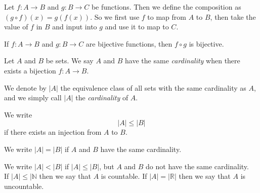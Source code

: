 \documentclass[../main.tex]{subfiles}
\begin{document}
\begin{definition}
Let $f: A \to B$ and $g:B \to C$ be functions. Then we define the composition as $(g \circ f)(x) = g(f(x))$. So we first use $f$ to map from $A$ to $B$, then take the value of $f$ in $B$ and input into $g$ and use it to map to $C$.
\end{definition}



\begin{proposition}
If $f: A \to B$ and $g: B\to C$ are bijective functions, then $f \circ g$ is bijective.
\end{proposition}






\begin{definition} \label{def:cardinality}
    Let \( A \) and \( B \) be sets. We say \( A \) and \( B \) have the same \textit{cardinality} when there exists a bijection \( f: A \to B \). 
    
    We denote by \( |A| \) the equivalence class of all sets with the same cardinality as \( A \), and we simply call \( |A| \) the \textit{cardinality} of \( A \).
\end{definition}
    
    
    
    
    
    
    
    
    
    
    
    
    
    
    
    
    
    
    
    
\begin{definition} \label{def:cardinality_comparison}
    We write
    \[
    |A| \leq |B|
    \]
    if there exists an injection from \( A \) to \( B \). 
    
    We write \( |A| = |B| \) if \( A \) and \( B \) have the same cardinality. 
    
    We write \( |A| < |B| \) if \( |A| \leq |B| \), but \( A \) and \( B \) do not have the same cardinality.\\
    If $ |A| \leq |\mathbb{N}$ then we say that $A$ is countable. If $|A| = |\mathbb{R}|$ then we say that $A$ is uncountable.
\end{definition}
    
    
    
    
\end{document}
